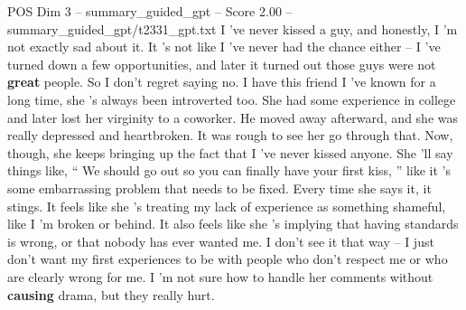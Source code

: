 \begin{textsample}{POS Dim 3 – summary\_guided\_gpt – Score 2.00 – summary\_guided\_gpt/t2331\_gpt.txt}  \label{ex:f3_pos_021}
I ’ve never kissed a guy, and honestly, I ’m not exactly sad about it.
It ’s not like I ’ve never had the chance either – I ’ve turned down a few opportunities, and later it turned out those guys were not \textbf{great} people.
So I don't regret saying no.
I have this friend I ’ve known for a long time, she ’s always been introverted too.
She had some experience in college and later lost her virginity to a coworker.
He moved away afterward, and she was really depressed and heartbroken.
It was rough to see her go through that.
Now, though, she keeps bringing up the fact that I ’ve never kissed anyone.
She ’ll say things like, “ We should go out so you can finally have your first kiss, ” like it ’s some embarrassing problem that needs to be fixed.
Every time she says it, it stings.
It feels like she ’s treating my lack of experience as something shameful, like I ’m broken or behind.
It also feels like she ’s implying that having standards is wrong, or that nobody has ever wanted me.
I don't see it that way – I just don't want my first experiences to be with people who don't respect me or who are clearly wrong for me.
I ’m not sure how to handle her comments without \textbf{causing} drama, but they really hurt.

\end{textsample}
